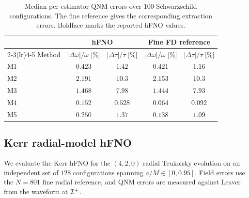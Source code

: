 \begin{table}[!htbp]
\centering
\caption{Median per-estimator QNM errors over $100$ Schwarzschild
configurations. The fine reference gives the corresponding extraction
errors. Boldface marks the reported hFNO values.}
\label{tab:hyb-canonical}
\footnotesize
\setlength{\tabcolsep}{3pt}
\begin{tabular}{@{}lcccc@{}}
\toprule
 & \multicolumn{2}{c}{hFNO}
 & \multicolumn{2}{c}{Fine FD reference} \\
\cmidrule(lr){2-3}\cmidrule(lr){4-5}
Method & $|\Delta\omega|/\omega$ [\%] & $|\Delta\tau|/\tau$ [\%]
  & $|\Delta\omega|/\omega$ [\%] & $|\Delta\tau|/\tau$ [\%] \\
\midrule
M1 & $0.423$ & $1.42$ & $0.421$ & $1.16$ \\
M2 & $2.191$ & $10.3$ & $2.153$ & $10.3$ \\
M3 & $1.468$ & $7.98$ & $1.444$ & $7.93$ \\
M4 & $\mathbf{0.152}$ & $\mathbf{0.528}$ & $0.064$ & $0.092$ \\
M5 & $0.250$ & $1.37$ & $0.138$ & $1.09$ \\
\bottomrule
\end{tabular}
\end{table}

\FloatBarrier

\subsection{Kerr radial-model hFNO}
\label{sec:res-kerr}

We evaluate the Kerr hFNO for the $(4,2,0)$ radial Teukolsky evolution
on an independent set of $128$ configurations spanning
$a/M\in[0,0.95]$. Field errors use the $N=801$ fine radial reference,
and QNM errors are measured against Leaver from the waveform at
$\mathcal{I}^{+}$.

